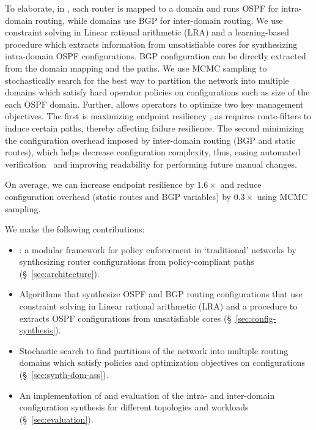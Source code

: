 To elaborate, in \name, each router is mapped to a domain and runs
OSPF for intra-domain routing, while domains use BGP for inter-domain
routing. We use constraint solving in Linear rational arithmetic (LRA)
and a learning-based procedure which extracts information from
unsatisfiable cores for synthesizing intra-domain OSPF configurations.
BGP configuration can be directly extracted from the domain mapping and the paths.
We use MCMC sampling to stochastically search for the best way to
partition the network into multiple domains which satisfy hard
operator policies on configurations such as size of the each OSPF
domain. Further, \name allows operators to optimize two key management
objectives. The first is maximizing endpoint resiliency , as \name
requires route-filters to induce certain paths, thereby affecting
failure resilience. The second minimizing the configuration overhead imposed
by inter-domain routing (BGP and static routes), which helps decrease
configuration complexity, thus, easing automated
verification~\cite{batfish, arc, era} and improving readability for
performing future manual changes.

  On average, we can increase
endpoint resilience by $1.6\times$ and reduce configuration overhead
(static routes and BGP variables) by $0.3\times$ using MCMC sampling.



 We make the following contributions:
\begin{itemize}
	\item \name: a modular framework 
	for policy enforcement in `traditional' networks
	by synthesizing router configurations from policy-compliant paths (\S~\ref{sec:architecture}). 
	\item Algorithms that synthesize OSPF and BGP routing configurations that use
	constraint solving in Linear rational arithmetic (LRA) and 
	a procedure to extracts OSPF configurations from 
	unsatisfiable cores (\S~\ref{sec:config-synthesis}). 
	\item Stochastic search to find 
	partitions of the network into multiple routing domains which
	satisfy policies and optimization objectives on configurations (\S~\ref{sec:synth-dom-ass}).
	\item An implementation of \name and evaluation of the 
	intra- and inter-domain configuration synthesis for different
	topologies and workloads (\S~\ref{sec:evaluation}). 
\end{itemize}
